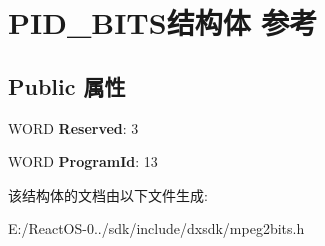 \hypertarget{struct_p_i_d___b_i_t_s}{}\section{P\+I\+D\+\_\+\+B\+I\+T\+S结构体 参考}
\label{struct_p_i_d___b_i_t_s}
\subsection*{Public 属性}
\begin{DoxyCompactItemize}
\item 
\mbox{\label{struct_p_i_d___b_i_t_s_a864c1cc6c9f55984e903f4e114e82384}} 
W\+O\+RD {\bfseries Reserved}\+: 3
\item 
\mbox{\label{struct_p_i_d___b_i_t_s_a2c23ffed142777b7a725cb7f9a1932de}} 
W\+O\+RD {\bfseries Program\+Id}\+: 13
\end{DoxyCompactItemize}


该结构体的文档由以下文件生成\+:\begin{DoxyCompactItemize}
\item 
E\+:/\+React\+O\+S-\/0../sdk/include/dxsdk/mpeg2bits.\+h\end{DoxyCompactItemize}
